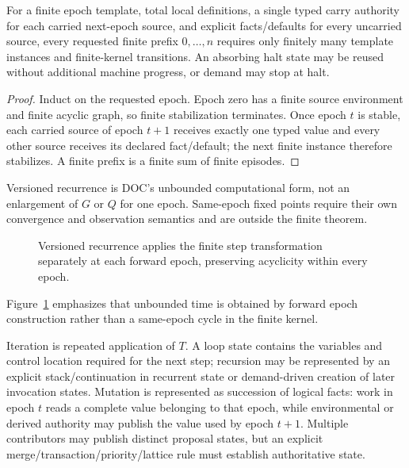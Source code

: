 \begin{theorem}\label{thm:recurrence}
For a finite epoch template, total local definitions, a single typed carry authority for each carried next-epoch source, and explicit facts/defaults for every uncarried source, every requested finite prefix $0,\ldots,n$ requires only finitely many template instances and finite-kernel transitions. An absorbing halt state may be reused without additional machine progress, or demand may stop at halt.
\end{theorem}
\begin{proof}
Induct on the requested epoch. Epoch zero has a finite source environment and finite acyclic graph, so finite stabilization terminates. Once epoch $t$ is stable, each carried source of epoch $t+1$ receives exactly one typed value and every other source receives its declared fact/default; the next finite instance therefore stabilizes. A finite prefix is a finite sum of finite episodes.
\end{proof}
Versioned recurrence is DOC's unbounded computational form, not an enlargement of $G$ or $Q$ for one epoch. Same-epoch fixed points require their own convergence and observation semantics and are outside the finite theorem.

\iffullvisuals
\begin{figure}[t]
\centering
{}
\caption{Versioned recurrence applies the finite step transformation separately at each forward epoch, preserving acyclicity within every epoch.}\label{fig:recurrence}
\end{figure}
Figure~\ref{fig:recurrence} emphasizes that unbounded time is obtained by forward epoch construction rather than a same-epoch cycle in the finite kernel.
\fi

Iteration is repeated application of $T$. A loop state contains the variables and control location required for the next step; recursion may be represented by an explicit stack/continuation in recurrent state or demand-driven creation of later invocation states. Mutation is represented as succession of logical facts: work in epoch $t$ reads a complete value belonging to that epoch, while environmental or derived authority may publish the value used by epoch $t+1$. Multiple contributors may publish distinct proposal states, but an explicit merge/transaction/priority/lattice rule must establish authoritative state.

